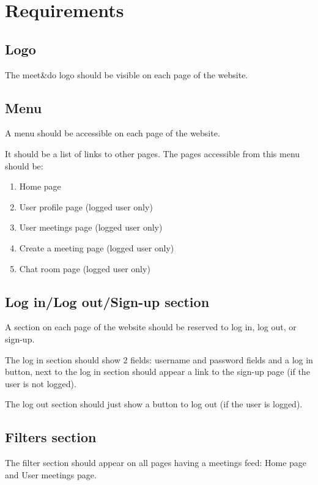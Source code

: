 \documentclass[conference]{IEEEtran}
\begin{document}
\section{Requirements}

\subsection{Logo}

The meet\&do logo should be visible on each page of the website.

\subsection{Menu}

A menu should be accessible on each page of the website.

It should be a list of links to other pages.
The pages accessible from this menu should be:

\begin{enumerate}
    \item Home page
    \item User profile page (logged user only)
    \item User meetings page (logged user only)
    \item Create a meeting page (logged user only)
    \item Chat room page (logged user only)
\end{enumerate}

\subsection{Log in/Log out/Sign-up section}

A section on each page of the website should be reserved to log in, log out, or sign-up.

The log in section should show 2 fields: username and password fields and a log in button, next to the log in section should appear a link to the sign-up page (if the user is not logged).

The log out section should just show a button to log out (if the user is logged).

\subsection{Filters section}

The filter section should appear on all pages having a meetings feed: Home page and User meetings page.
\end{document}
